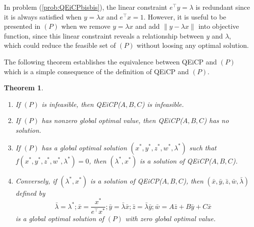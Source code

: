 \documentclass[3p]{elsarticle}
\newtheorem{thm}{Theorem}
\begin{document}
\begin{rmk}
	In problem (\ref{prob:QEiCPbisbis}), the linear constraint $e^{\top}y=\lambda$ is redundant since it is always satisfied when $y=\lambda x$ and $e^{\top}x=1$. However, it is useful to be presented in $(P)$ when we remove $y=\lambda x$ and add $\|y-\lambda x\|$ into objective function, since this linear constraint reveals a relationship between $y$ and $\lambda$, which could reduce the feasible set of $(P)$ without loosing any optimal solution. 
\end{rmk}

The following theorem establishes the equivalence between QEiCP and $(P)$ which is a simple consequence of the definition of QEiCP and $(P)$.
\begin{thm}\label{thm:equivofQEiCPandP} \mbox{}\par
	\begin{enumerate}
		\item[(i)] If $(P)$ is infeasible, then QEiCP($A,B,C$) is infeasible.
		\item[(ii)] If $(P)$ has nonzero global optimal value, then QEiCP($A,B,C$) has no solution.  
		\item[(iii)] If $(P)$ has a global optimal solution $(x^*,y^*,z^*,w^*,\lambda^*)$ such that $f(x^*,y^*,z^*,w^*,\lambda^*)=0$, then $(\lambda^*,x^*)$ is a solution of QEiCP($A,B,C$). 
		\item[(iv)] Conversely, if $(\lambda^*,x^*)$ is a solution of QEiCP($A,B,C$), then $(\bar{x},\bar{y},\bar{z},\bar{w},\bar{
			\lambda})$ defined by
		$$\bar{\lambda}=\lambda^*; \bar{x} = \frac{x^*}{e^{\top}x^*}; \bar{y}= \bar{\lambda}\bar{x}; \bar{z}=\bar{\lambda}\bar{y}; \bar{w} = A\bar{z} + B\bar{y} + C\bar{x}$$
		is a global optimal solution of $(P)$ with zero global optimal value.
	\end{enumerate}
\end{thm}
\end{document}
